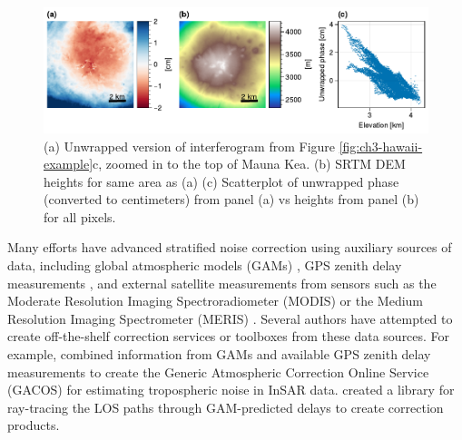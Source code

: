 \begin{figure}[!h]
	\centering
	\includegraphics[width=1.0\textwidth]{figures/chapter3-sar/hawaii-strat-zoom.pdf}
	\caption[Stratified tropospheric noise over Hawaii]{
		(a) Unwrapped version of interferogram from Figure \ref{fig:ch3-hawaii-example}c, zoomed in to the top of Mauna Kea.
		(b) SRTM DEM heights for same area as (a)
		(c) Scatterplot of unwrapped phase (converted to centimeters) from panel (a) vs heights from panel (b) for all pixels.
	}
	\label{fig:ch3-hawaii-strat}
\end{figure}


Many efforts have advanced stratified noise correction using auxiliary sources of data, including global atmospheric models (GAMs) \citep{Doin2009CorrectionsStratifiedTropospheric, Jolivet2011SystematicInsarTropospheric, Jolivet2014ImprovingInsarGeodesy, Cao2021AdvancedInsarTropospheric}, GPS zenith delay measurements \citep{Onn2006ModelingWaterVapor, Yu2017GenerationRealTime}, and external satellite measurements from sensors such as the Moderate Resolution Imaging Spectroradiometer (MODIS) \citep{Li2005InterferometricSyntheticAperture, Barnhart2013CharacterizingEstimatingNoise} or the Medium Resolution Imaging Spectrometer (MERIS)  \citep{Ding2008AtmosphericEffectsInsar}.
Several authors have attempted to create off-the-shelf correction services or toolboxes from these data sources. For example,	
\cite{Yu2018GenericAtmosphericCorrection} combined information from GAMs and available GPS zenith delay measurements to create the Generic Atmospheric Correction Online Service (GACOS) for estimating tropospheric noise in InSAR data. \cite{Maurer2021RaiderRaytracingAtmospheric} created a library for ray-tracing the LOS paths through GAM-predicted delays to create correction products.



